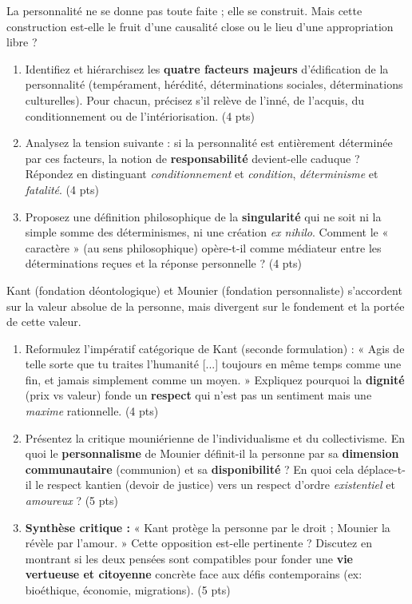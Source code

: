 \documentclass[11pt]{article}
\begin{document}
\begin{exercice}
La personnalité ne se donne pas toute faite ; elle se construit. Mais cette construction est-elle le fruit d'une causalité close ou le lieu d'une appropriation libre ?
\begin{enumerate}
    \item Identifiez et hiérarchisez les \textbf{quatre facteurs majeurs} d'édification de la personnalité (tempérament, hérédité, déterminations sociales, déterminations culturelles). Pour chacun, précisez s'il relève de l'inné, de l'acquis, du conditionnement ou de l'intériorisation. (4 pts)
    \item Analysez la tension suivante : si la personnalité est entièrement déterminée par ces facteurs, la notion de \textbf{responsabilité} devient-elle caduque ? Répondez en distinguant \textit{conditionnement} et \textit{condition}, \textit{déterminisme} et \textit{fatalité}. (4 pts)
    \item Proposez une définition philosophique de la \textbf{singularité} qui ne soit ni la simple somme des déterminismes, ni une création \textit{ex nihilo}. Comment le « caractère » (au sens philosophique) opère-t-il comme médiateur entre les déterminations reçues et la réponse personnelle ? (4 pts)
\end{enumerate}
\end{exercice}

\begin{exercice}
Kant (fondation déontologique) et Mounier (fondation personnaliste) s'accordent sur la valeur absolue de la personne, mais divergent sur le fondement et la portée de cette valeur.
\begin{enumerate}
    \item Reformulez l'impératif catégorique de Kant (seconde formulation) : « Agis de telle sorte que tu traites l'humanité [...] toujours en même temps comme une fin, et jamais simplement comme un moyen. » Expliquez pourquoi la \textbf{dignité} (prix vs valeur) fonde un \textbf{respect} qui n'est pas un sentiment mais une \textit{maxime} rationnelle. (4 pts)
    \item Présentez la critique mouniérienne de l'individualisme et du collectivisme. En quoi le \textbf{personnalisme} de Mounier définit-il la personne par sa \textbf{dimension communautaire} (communion) et sa \textbf{disponibilité} ? En quoi cela déplace-t-il le respect kantien (devoir de justice) vers un respect d'ordre \textit{existentiel} et \textit{amoureux} ? (5 pts)
    \item \textbf{Synthèse critique :} « Kant protège la personne par le droit ; Mounier la révèle par l'amour. » Cette opposition est-elle pertinente ? Discutez en montrant si les deux pensées sont compatibles pour fonder une \textbf{vie vertueuse et citoyenne} concrète face aux défis contemporains (ex: bioéthique, économie, migrations). (5 pts)
\end{enumerate}
\end{exercice}
\end{document}
